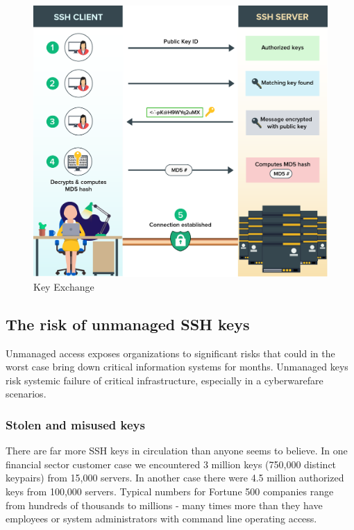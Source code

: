 \documentclass{article}
\begin{document}
\begin{figure}[!h]
    \centering
    \includegraphics[width=1 \textwidth]{keyExchange.png}
    \caption{Key Exchange}
\end{figure}


\subsection{The risk of unmanaged SSH keys}
Unmanaged access exposes organizations to significant risks that could in the worst case bring down critical information systems for months. Unmanaged keys risk systemic failure of critical infrastructure, especially in a cyberwarefare scenarios.

\subsubsection{Stolen and misused keys}
There are far more SSH keys in circulation than anyone seems to believe. In one financial sector customer case we encountered 3 million keys (750,000 distinct keypairs) from 15,000 servers. In another case there were 4.5 million authorized keys from 100,000 servers. Typical numbers for Fortune 500 companies range from hundreds of thousands to millions - many times more than they have employees or system administrators with command line operating access.
\end{document}
